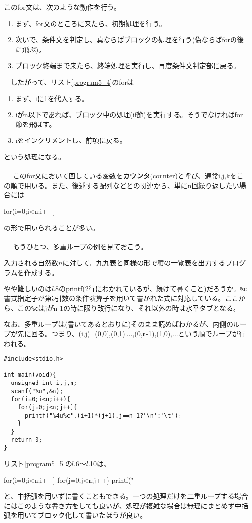 このfor文は、次のような動作を行う。
\begin{enumerate}
\item まず、for文のところに来たら、初期処理を行う。
\item 次いで、条件文を判定し、真ならばブロックの処理を行う(偽ならばforの後に飛ぶ)。
\item ブロック終端まで来たら、終端処理を実行し、再度条件文判定部に戻る。
\end{enumerate}
　したがって、リスト\ref{program5_4}のforは
\begin{enumerate}
\item まず、iに1を代入する。
\item iがn以下であれば、ブロック中の処理(if節)を実行する。そうでなければfor節を飛ばす。
\item iをインクリメントし、前項に戻る。
\end{enumerate}
という処理になる。
\\ \\　
このfor文において回している変数を\textbf{カウンタ}(counter)と呼び、通常i,j,kをこの順で用いる。また、後述する配列などとの関連から、単にn回繰り返したい場合には
\begin{code}
for(i=0;i<n;i++)
\end{code}
の形で用いられることが多い。
\\ \\　
もうひとつ、多重ループの例を見ておこう。
\begin{boxnote}
入力される自然数$n$に対して、九九表と同様の形で積の一覧表を出力するプログラムを作成する。
\begin{multicols}{2}
やや難しいのは$l$.8のprintf(2行にわかれているが、続けて書くこと)だろうか。\verb|%c|書式指定子が第3引数の条件演算子を用いて書かれた式に対応している。ここから、この\verb|%c|はjがn-1の時に限り改行になり、それ以外の時は水平タブとなる。

なお、多重ループは(書いてあるとおりに)そのまま読めばわかるが、内側のループが先に回る。つまり、(i,j)=(0,0),(0,1),...,(0,n-1),(1,0),...という順でループが行われる。
\begin{lstlisting}[caption=掛け算表の出力,label=program5_5]
#include<stdio.h>

int main(void){
  unsigned int i,j,n;
  scanf("%u",&n);
  for(i=0;i<n;i++){
    for(j=0;j<n;j++){
      printf("%4u%c",(i+1)*(j+1),j==n-1?'\n':'\t');
    }
  }
  return 0;
}
\end{lstlisting}
\end{multicols}
\end{boxnote}
リスト\ref{program5_5}の$l$.6〜$l$.10は、
\begin{code}
for(i=0;i<n;i++) for(j=0;j<n;j++) printf("%
\end{code}
と、中括弧を用いずに書くこともできる。一つの処理だけを二重ループする場合にはこのような書き方をしても良いが、処理が複雑な場合は無理にまとめず中括弧を用いてブロック化して書いたほうが良い。

